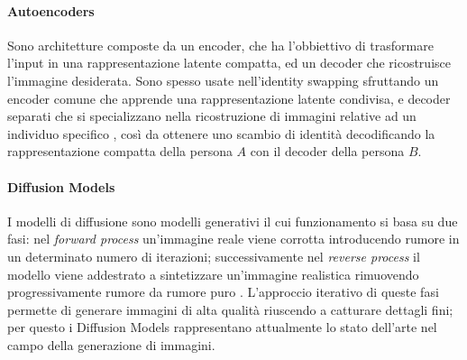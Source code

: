 \paragraph{Autoencoders} Sono architetture composte da un encoder, che ha l'obbiettivo di trasformare l'input in una rappresentazione latente compatta, ed un decoder che ricostruisce l'immagine desiderata. Sono spesso usate nell'identity swapping sfruttando un encoder comune che apprende una rappresentazione latente condivisa, e decoder separati che si specializzano nella ricostruzione di immagini relative ad un individuo specifico \cite{fernando2025face}, così da ottenere uno scambio di identità decodificando la rappresentazione compatta della persona $A$ con il decoder della persona $B$.
\paragraph{Diffusion Models} I modelli di diffusione sono modelli generativi il cui funzionamento si basa su due fasi: nel \textit{forward process} un'immagine reale viene corrotta introducendo rumore in un determinato numero di iterazioni; successivamente nel \textit{reverse process} il modello viene addestrato a sintetizzare un'immagine realistica rimuovendo progressivamente rumore da rumore puro \cite{ho2020denoising}. L'approccio iterativo di queste fasi permette di generare immagini di alta qualità riuscendo a catturare dettagli fini; per questo i Diffusion Models  rappresentano attualmente lo stato dell'arte nel campo della generazione di immagini.
